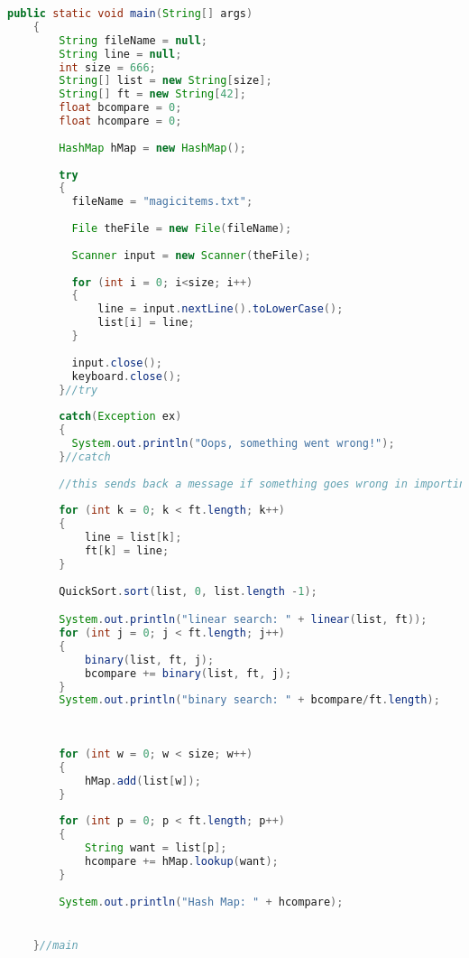 \documentclass[letterpaper, 10pt]{article}
\begin{document}
\begin{lstlisting}[language = java]
public static void main(String[] args) 
	{
		String fileName = null;
	    String line = null;
	    int size = 666;
	    String[] list = new String[size];
		String[] ft = new String[42];
		float bcompare = 0;
		float hcompare = 0;
		
		HashMap hMap = new HashMap();
		
		try
	    { 
	      fileName = "magicitems.txt";
	     
	      File theFile = new File(fileName);   
	      
	      Scanner input = new Scanner(theFile);
	    		 
	      for (int i = 0; i<size; i++)
	      {
	    	  line = input.nextLine().toLowerCase();
	    	  list[i] = line;
	      }
	   
	      input.close();
	      keyboard.close();
	    }//try
	    
	    catch(Exception ex)
	    {
	      System.out.println("Oops, something went wrong!");
	    }//catch
	    
	    //this sends back a message if something goes wrong in importing the text into the array from magic items
		
		for (int k = 0; k < ft.length; k++)
		{
			line = list[k];
	    	ft[k] = line;
		}
		
		QuickSort.sort(list, 0, list.length -1);

		System.out.println("linear search: " + linear(list, ft));
		for (int j = 0; j < ft.length; j++)
		{
			binary(list, ft, j);
			bcompare += binary(list, ft, j);
		}
		System.out.println("binary search: " + bcompare/ft.length);
        
        
        
        for (int w = 0; w < size; w++)
		{
			hMap.add(list[w]);
		}
        
        for (int p = 0; p < ft.length; p++)
        {
        	String want = list[p];
        	hcompare += hMap.lookup(want);
        }
        
        System.out.println("Hash Map: " + hcompare);


	}//main

\end{lstlisting}
\end{document}
